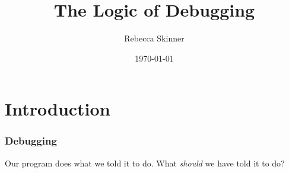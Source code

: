 \documentclass{beamer}
\title{The Logic of Debugging}
\author{Rebecca Skinner}
\institute{rebecca@rebeccaskinner.net}
\date{\today}
\begin{document}
\begin{frame}
    \titlepage
\end{frame}

\section{Introduction}
\begin{frame}
    \frametitle{Debugging}

    Our program does what we told it to do.  What \textit{should} we have told it
    to do?

\end{frame}
\end{document}
